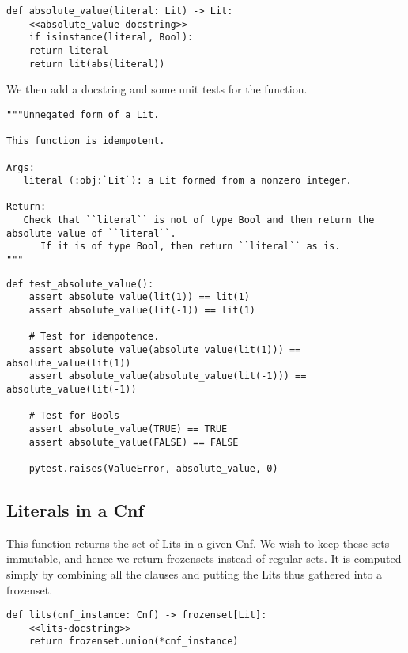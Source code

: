 \documentclass[11pt]{article}
\begin{document}
\begin{verbatim}
def absolute_value(literal: Lit) -> Lit:
    <<absolute_value-docstring>>
    if isinstance(literal, Bool):
	return literal
    return lit(abs(literal))
\end{verbatim}

We then add a docstring and some unit tests for the function.

\begin{verbatim}
"""Unnegated form of a Lit.

This function is idempotent.

Args:
   literal (:obj:`Lit`): a Lit formed from a nonzero integer.

Return:
   Check that ``literal`` is not of type Bool and then return the absolute value of ``literal``.
      If it is of type Bool, then return ``literal`` as is.
"""
\end{verbatim}

\begin{verbatim}
def test_absolute_value():
    assert absolute_value(lit(1)) == lit(1)
    assert absolute_value(lit(-1)) == lit(1)

    # Test for idempotence.
    assert absolute_value(absolute_value(lit(1))) == absolute_value(lit(1))
    assert absolute_value(absolute_value(lit(-1))) == absolute_value(lit(-1))

    # Test for Bools
    assert absolute_value(TRUE) == TRUE
    assert absolute_value(FALSE) == FALSE

    pytest.raises(ValueError, absolute_value, 0)
\end{verbatim}

\subsection{Literals in a Cnf}
\label{sec:orga212744}
This function returns the set of Lits in a given Cnf. We wish to keep these
sets immutable, and hence we return frozensets instead of regular sets. It
is computed simply by combining all the clauses and putting the Lits thus
gathered into a frozenset.

\begin{verbatim}
def lits(cnf_instance: Cnf) -> frozenset[Lit]:
    <<lits-docstring>>
    return frozenset.union(*cnf_instance)
\end{verbatim}
\end{document}
